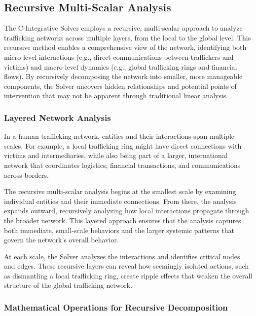 \documentclass[%
 preprint, linenumbers,
 amsmath,amssymb,
 aps, physrev,
]{revtex4-2}
\begin{document}
\subsection{Recursive Multi-Scalar Analysis}

The C-Integrative Solver employs a recursive, multi-scalar approach to analyze trafficking networks across multiple layers, from the local to the global level. This recursive method enables a comprehensive view of the network, identifying both micro-level interactions (e.g., direct communications between traffickers and victims) and macro-level dynamics (e.g., global trafficking rings and financial flows). By recursively decomposing the network into smaller, more manageable components, the Solver uncovers hidden relationships and potential points of intervention that may not be apparent through traditional linear analysis.

\subsubsection{Layered Network Analysis}

In a human trafficking network, entities and their interactions span multiple scales. For example, a local trafficking ring might have direct connections with victims and intermediaries, while also being part of a larger, international network that coordinates logistics, financial transactions, and communications across borders.

The recursive multi-scalar analysis begins at the smallest scale by examining individual entities and their immediate connections. From there, the analysis expands outward, recursively analyzing how local interactions propagate through the broader network. This layered approach ensures that the analysis captures both immediate, small-scale behaviors and the larger systemic patterns that govern the network’s overall behavior.

At each scale, the Solver analyzes the interactions and identifies critical nodes and edges. These recursive layers can reveal how seemingly isolated actions, such as dismantling a local trafficking ring, create ripple effects that weaken the overall structure of the global trafficking network.

\subsubsection{Mathematical Operations for Recursive Decomposition}
\end{document}
